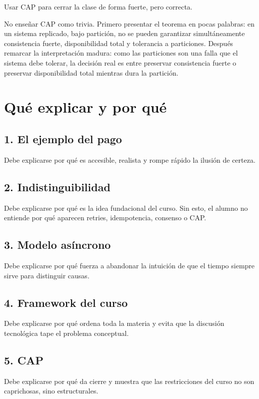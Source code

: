 \documentclass[variant=docente,cover=institutional,mode=screen]{ua-engineering-v6-article}
\begin{document}
Usar CAP para cerrar la clase de forma fuerte, pero correcta.

No enseñar CAP como trivia.
Primero presentar el teorema en pocas palabras: en un sistema replicado, bajo partición, no se pueden garantizar simultáneamente consistencia fuerte, disponibilidad total y tolerancia a particiones.
Después remarcar la interpretación madura: como las particiones son una falla que el sistema debe tolerar, la decisión real es entre preservar consistencia fuerte o preservar disponibilidad total mientras dura la partición.

\section{Qué explicar y por qué}\label{sec:que-explicar-y-por-que}

\subsection*{1. El ejemplo del pago}
Debe explicarse por qué es accesible, realista y rompe rápido la ilusión de certeza.

\subsection*{2. Indistinguibilidad}
Debe explicarse por qué es la idea fundacional del curso.
Sin esto, el alumno no entiende por qué aparecen retries, idempotencia, consenso o CAP\@.

\subsection*{3. Modelo asíncrono}
Debe explicarse por qué fuerza a abandonar la intuición de que el tiempo siempre sirve para distinguir causas.

\subsection*{4. Framework del curso}
Debe explicarse por qué ordena toda la materia y evita que la discusión tecnológica tape el problema conceptual.

\subsection*{5. CAP}
Debe explicarse por qué da cierre y muestra que las restricciones del curso no son caprichosas, sino estructurales.
\end{document}
